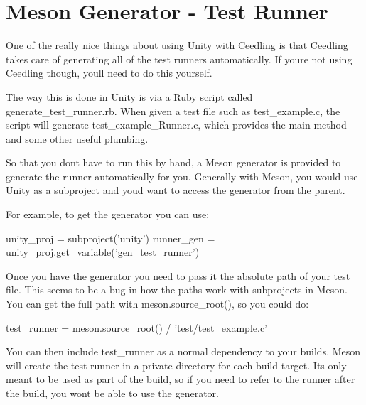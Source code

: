 \chapter{Meson Generator -\/ Test Runner}
\hypertarget{md_src_2Unity_2docs_2MesonGeneratorRunner}{}\label{md_src_2Unity_2docs_2MesonGeneratorRunner}
\label{md_src_2Unity_2docs_2MesonGeneratorRunner_autotoc_md31}%
%


One of the really nice things about using Unity with Ceedling is that Ceedling takes care of generating all of the test runners automatically. If you\textquotesingle{}re not using Ceedling though, you\textquotesingle{}ll need to do this yourself.

The way this is done in Unity is via a Ruby script called {\ttfamily generate\+\_\+test\+\_\+runner.\+rb}. When given a test file such as {\ttfamily test\+\_\+example.\+c}, the script will generate {\ttfamily test\+\_\+example\+\_\+\+Runner.\+c}, which provides the {\ttfamily main} method and some other useful plumbing.

So that you don\textquotesingle{}t have to run this by hand, a Meson generator is provided to generate the runner automatically for you. Generally with Meson, you would use Unity as a subproject and you\textquotesingle{}d want to access the generator from the parent.

For example, to get the generator you can use\+: \begin{DoxyVerb}unity_proj = subproject('unity')
runner_gen = unity_proj.get_variable('gen_test_runner')
\end{DoxyVerb}


Once you have the generator you need to pass it the absolute path of your test file. This seems to be a bug in how the paths work with subprojects in Meson. You can get the full path with {\ttfamily meson.\+source\+\_\+root()}, so you could do\+: \begin{DoxyVerb}test_runner = meson.source_root() / 'test/test_example.c'
\end{DoxyVerb}


You can then include {\ttfamily test\+\_\+runner} as a normal dependency to your builds. Meson will create the test runner in a private directory for each build target. It\textquotesingle{}s only meant to be used as part of the build, so if you need to refer to the runner after the build, you won\textquotesingle{}t be able to use the generator. 